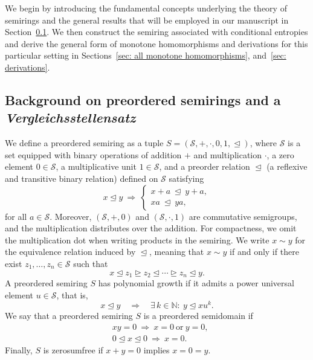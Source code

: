 \documentclass[aps,pra,11pt,onecolumn,nofootinbib,tightenlines]{revtex4-2}
\theoremstyle{definition}
\newcommand{\rleq}{\trianglelefteq}
\newcommand{\rgeq}{\trianglerighteq}
\begin{document}
We begin by introducing the fundamental concepts underlying the theory of semirings and the general results that will be employed in our manuscript in Section~\ref{sec: background semiring}. We then construct the semiring associated with conditional entropies and derive the general form of monotone homomorphisms and derivations for this particular setting in Sections~\ref{sec: all monotone homomorphisms}, and~\ref{sec: derivations}.

\subsection{Background on preordered semirings and a \textit{Vergleichsstellensatz}}
\label{sec: background semiring}
We define a preordered semiring as a tuple $S = (\mathcal{S}, +, \cdot, 0, 1, \rleq)$, where $\mathcal{S}$ is a set equipped with binary operations of addition $+$ and multiplication $\cdot$, a zero element $0 \in \mathcal{S}$, a multiplicative unit $1 \in \mathcal{S}$, and a preorder relation $\rleq$  (a reflexive and transitive binary relation) defined on $\mathcal{S}$  satisfying
\begin{equation}
    x \rleq y \ \Rightarrow \
\begin{cases}
x + a \ \rleq\ y + a, \\[0.3em]
x a \ \rleq\ y a,
\end{cases}
\end{equation}
for all $a \in \mathcal{S}$.
Moreover,
$(\mathcal{S}, +, 0)$ and $(\mathcal{S}, \cdot, 1)$ are commutative semigroups, and the multiplication distributes over the addition.
For compactness, we omit the multiplication dot when writing products in the semiring.
We write $x \sim y$ for the equivalence relation induced by $\rleq$, meaning that $x \sim y$ if and only if there exist $z_1, \ldots, z_n \in \mathcal{S}$ such that
\begin{equation}
    x \rleq z_1 \rgeq z_2 \rleq \cdots \rgeq z_n \rleq y.
\end{equation}
A preordered semiring $S$ has polynomial growth if it admits a power universal element $u \in \mathcal{S}$, that is,
\begin{equation}
    x \rleq y \quad \Rightarrow \quad \exists\, k \in \mathbb{N}:\ y \rleq x u^k.
\end{equation}
We say that a preordered semiring $S$ is a preordered semidomain if
\begin{equation}
    \begin{aligned}
&xy = 0 \ \Rightarrow\ x = 0 \ \text{or} \ y = 0, \\
&0 \rleq x \rleq 0 \ \Rightarrow\ x = 0.
\end{aligned}
\end{equation}
Finally, $S$ is zerosumfree if $x + y = 0$ implies $x = 0 = y$.
\end{document}
